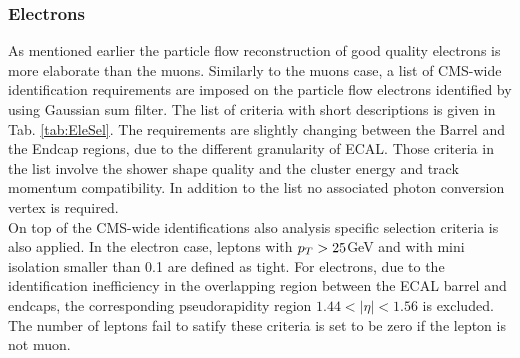 \subsubsection{Electrons}
As mentioned earlier the particle flow reconstruction of good quality electrons \cite{ELEID} is more elaborate than the muons. 
Similarly to the muons case, a list of CMS-wide identification requirements are imposed on the particle flow electrons identified by using Gaussian sum filter. The list of criteria with short descriptions is given in Tab. \ref{tab:EleSel}. The requirements are slightly changing between the Barrel and the Endcap regions, due to the different granularity of ECAL. Those criteria \cite{ELEID2} in the list involve the shower shape quality and the cluster energy and track momentum compatibility. In addition to the list no associated photon conversion vertex is required.\\
On top of the CMS-wide identifications also analysis specific selection criteria is also applied. In the electron case, leptons with $p_T>25$GeV and with mini isolation smaller than 0.1 are defined as tight. For electrons, due to the identification inefficiency in the overlapping region between the ECAL barrel and endcaps, the corresponding pseudorapidity region $1.44<|\eta|<1.56$ is excluded. The number of leptons fail to satify these criteria is set to be zero if the lepton is not muon.\\  
\renewcommand{\arraystretch}{1.5}
